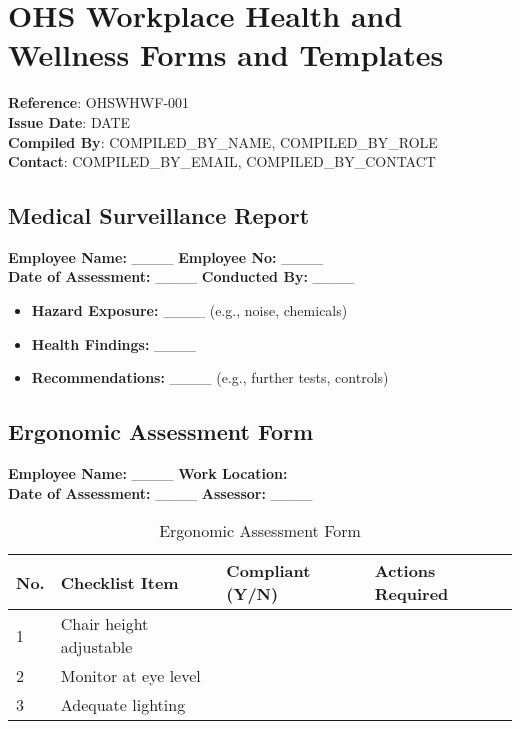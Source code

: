 \documentclass[11pt]{article}
\newcommand{\docTitle}{OHS Workplace Health and Wellness Forms and Templates}
\newcommand{\refNumber}{OHSWHWF-001}
\newcommand{\issueDate}{{{DATE}}}
\newcommand{\location}{}
\newcommand{\compilerName}{{{COMPILED_BY_NAME}}}
\newcommand{\compilerRole}{{{COMPILED_BY_ROLE}}}
\newcommand{\compilerEmail}{{{COMPILED_BY_EMAIL}}}
\newcommand{\compilerPhone}{{{COMPILED_BY_CONTACT}}}
\begin{document}
\section*{\docTitle}
\textbf{Reference}: \refNumber \\
\textbf{Issue Date}: \issueDate \\
\textbf{Compiled By}: \compilerName, \compilerRole \\
\textbf{Contact}: \compilerEmail, \compilerPhone

\subsection*{Medical Surveillance Report}

\textbf{Employee Name:} \_\_\_\_ \textbf{Employee No:} \_\_\_\_ \\
\textbf{Date of Assessment:} \_\_\_\_ \textbf{Conducted By:} \_\_\_\_

\begin{itemize}
    \item \textbf{Hazard Exposure:} \_\_\_\_ (e.g., noise, chemicals)
    \item \textbf{Health Findings:} \_\_\_\_
    \item \textbf{Recommendations:} \_\_\_\_ (e.g., further tests, controls)
\end{itemize}

\subsection*{Ergonomic Assessment Form}

\textbf{Employee Name:} \_\_\_\_ \textbf{Work Location:} \location \\
\textbf{Date of Assessment:} \_\_\_\_ \textbf{Assessor:} \_\_\_\_

\begin{table}[h]
    \centering
    \begin{tabular}{p{1cm}p{5cm}p{2cm}p{3cm}}
        \toprule
        \textbf{No.} & \textbf{Checklist Item} & \textbf{Compliant (Y/N)} & \textbf{Actions Required} \\
        \midrule
        1 & Chair height adjustable & & \\
        2 & Monitor at eye level & & \\
        3 & Adequate lighting & & \\
        \bottomrule
    \end{tabular}
    \caption{Ergonomic Assessment Form}
\end{table}
\end{document}
